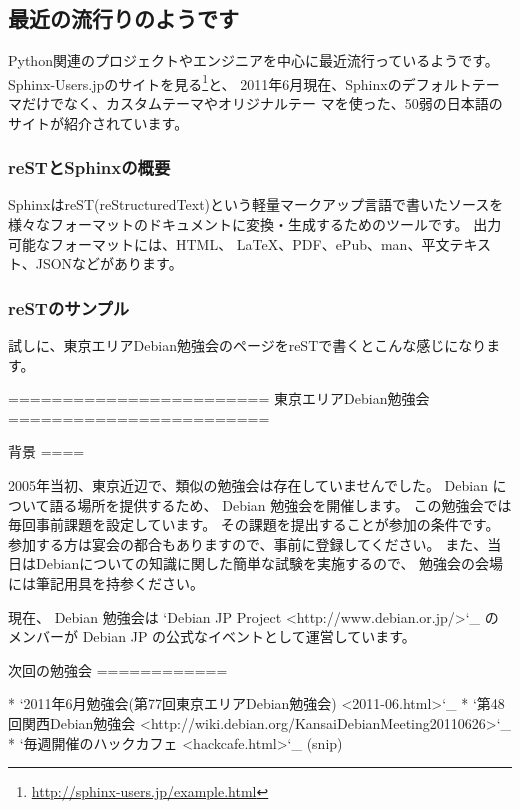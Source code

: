 \documentclass[mingoth,a4paper]{jsarticle}
\begin{document}
\subsection{最近の流行りのようです}

Python関連のプロジェクトやエンジニアを中心に最近流行っているようです。
Sphinx-Users.jpのサイトを見る\footnote{\url{http://sphinx-users.jp/example.html}}と、
2011年6月現在、Sphinxのデフォルトテーマだけでなく、カスタムテーマやオリジナルテー
マを使った、50弱の日本語のサイトが紹介されています。

\subsubsection{reSTとSphinxの概要}

SphinxはreST(reStructuredText)という軽量マークアップ言語で書いたソースを
様々なフォーマットのドキュメントに変換・生成するためのツールです。
出力可能なフォーマットには、HTML、 \LaTeX 、PDF、ePub、man、平文テキスト、JSONなどがあります。

\subsubsection{reSTのサンプル}

試しに、東京エリアDebian勉強会のページをreSTで書くとこんな感じになります。

\begin{commandline}
========================
 東京エリアDebian勉強会
========================


背景
====

2005年当初、東京近辺で、類似の勉強会は存在していませんでした。
Debian について語る場所を提供するため、 Debian 勉強会を開催します。 
この勉強会では毎回事前課題を設定しています。
その課題を提出することが参加の条件です。 
参加する方は宴会の都合もありますので、事前に登録してください。 
また、当日はDebianについての知識に関した簡単な試験を実施するので、
勉強会の会場には筆記用具を持参ください。

現在、 Debian 勉強会は
`Debian JP Project <http://www.debian.or.jp/>`_
のメンバーが Debian JP の公式なイベントとして運営しています。

次回の勉強会
============

* `2011年6月勉強会(第77回東京エリアDebian勉強会) <2011-06.html>`_
* `第48回関西Debian勉強会 <http://wiki.debian.org/KansaiDebianMeeting20110626>`_
* `毎週開催のハックカフェ <hackcafe.html>`_
(snip)
\end{commandline}
\end{document}
